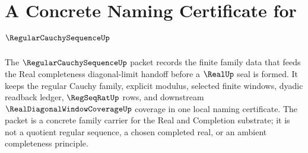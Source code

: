 \chapter{A Concrete Naming Certificate for $\RegularCauchySequenceUp$}
\label{ch:concrete-instances-regularcauchysequence-namecert}

The $\RegularCauchySequenceUp$ packet records the finite family data that feeds the Real completeness diagonal-limit handoff before a $\RealUp$ seal is formed. It keeps the regular Cauchy family, explicit modulus, selected finite windows, dyadic readback ledger, $\RegSeqRatUp$ rows, and downstream $\RealDiagonalWindowCoverageUp$ coverage in one local naming certificate. The packet is a concrete family carrier for the Real and Completion substrate; it is not a quotient regular sequence, a chosen completed real, or an ambient completeness principle.

